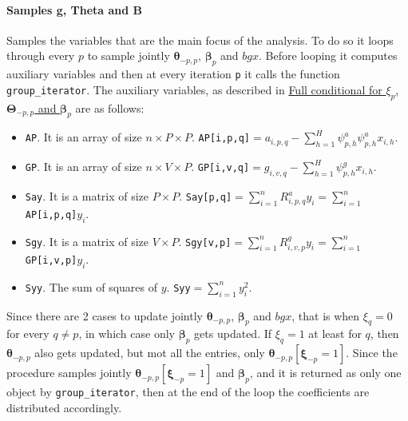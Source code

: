 \documentclass[
]{article}
\providecommand{\tightlist}{%
  \setlength{\itemsep}{0pt}\setlength{\parskip}{0pt}}
\begin{document}
\paragraph{Samples g, Theta and B}\label{samples-g-theta-and-b}

Samples the variables that are the main focus of the analysis. To do so it
loops through every \(p\) to sample jointly \( {\boldsymbol \theta} _{-p,p}\), \( {\boldsymbol \beta} _p\) and \(bgx\).
Before looping it computes auxiliary variables and then at every iteration \texttt{p} it
calls the function \texttt{group\_iterator}. The auxiliary variables, as described in
\hyperref[full-conditional-for-xi_p-boldsymbol-theta-_-pp-and-boldsymbol-beta-_p]{Full conditional for \(\xi_p\), \( {\boldsymbol \Theta} _{-p,p}\) and \( {\boldsymbol \beta} _p\)} are as follows:

\begin{itemize}
\tightlist
\item
  \texttt{AP}. It is an array of size \(n \times P \times P\).
  \texttt{AP{[}i,p,q{]}}\(=a_{i,p,q} - \sum_{h=1}^H \psi^a_{p,h} \psi^a_{p,h} x_{i,h}\).
\item
  \texttt{GP}. It is an array of size \(n \times V \times P\).
  \texttt{GP{[}i,v,q{]}}\(=g_{i,v,q} - \sum_{h=1}^H \psi^g_{p,h} x_{i,h}\).
\item
  \texttt{Say}. It is a matrix of size \(P \times P\).
  \texttt{Say{[}p,q{]}}\(=\sum_{i=1}^n R^a_{i,p,q}y_i=\sum_{i=1}^n\)\texttt{AP{[}i,p,q{]}}\(y_i\).
\item
  \texttt{Sgy}. It is a matrix of size \(V \times P\).
  \texttt{Sgy{[}v,p{]}}\(=\sum_{i=1}^n R^g_{i,v,p}y_i=\sum_{i=1}^n\)\texttt{GP{[}i,v,p{]}}\(y_i\).
\item
  \texttt{Syy}. The sum of squares of \(y\). \texttt{Syy}\(=\sum_{i=1}^n y_i^2\).
\end{itemize}

Since there are 2 cases to update jointly \( {\boldsymbol \theta} _{-p,p}\), \( {\boldsymbol \beta} _p\) and \(bgx\),
that is when \(\xi_q=0\) for every \(q\neq p\), in which case only \( {\boldsymbol \beta} _p\) gets
updated. If \(\xi_q=1\) at least for \(q\), then \( {\boldsymbol \theta} _{-p,p}\) also gets updated,
but mot all the entries, only \( {\boldsymbol \theta} _{-p,p}[ {\boldsymbol \xi} _{-p}=1]\). Since the procedure
samples jointly \( {\boldsymbol \theta} _{-p,p}[ {\boldsymbol \xi} _{-p}=1]\) and \( {\boldsymbol \beta} _p\), and it is returned as
only one object by \texttt{group\_iterator}, then at the end of the loop the coefficients
are distributed accordingly.
\end{document}
